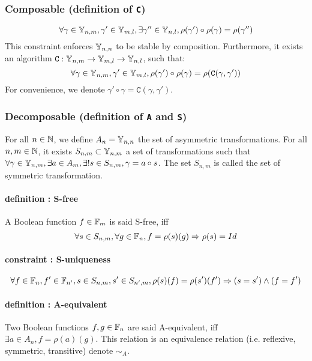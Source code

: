 \documentclass[a4paper,10pt]{article}
\begin{document}
\subsubsection{Composable (definition of \texttt{C})}
\[\forall \gamma \in \mathbb{Y}_{n, m}, \gamma' \in \mathbb{Y}_{m, l}, \exists \gamma'' \in \mathbb{Y}_{n, l}, \rho(\gamma') \circ 
\rho(\gamma) = \rho(\gamma'')\]
This constraint enforces $\mathbb{Y}_{n, n}$ to be stable by composition.
Furthermore, it exists an algorithm $\mathtt{C} : \mathbb{Y}_{n, m} \rightarrow \mathbb{Y}_{m, l} \rightarrow \mathbb{Y}_{n, l}$, such that:
\[\forall \gamma \in \mathbb{Y}_{n, m}, \gamma' \in \mathbb{Y}_{m, l}, \rho(\gamma') \circ \rho(\gamma) = \rho(\mathtt{C}(\gamma, \gamma'))\]
For convenience, we denote $\gamma' \circ \gamma = \mathtt{C}(\gamma, \gamma')$.

\subsubsection{Decomposable (definition of \texttt{A} and \texttt{S})}

For all $n\in\mathbb{N}$, we define $A_n = \mathbb{Y}_{n, n}$ the set of asymmetric transformations.
For all $n, m\in\mathbb{N}$, it exists $S_{n, m} \subset \mathbb{Y}_{n, m}$ a set of transformations such that $\forall \gamma \in \mathbb{Y}_{n, m}, \exists a \in A_m, \exists! s \in S_{n, m},  \gamma = a \circ s$.
The set $S_{n, m}$ is called the set of symmetric transformation.

\paragraph{definition : S-free\\}
A Boolean function $f\in\mathbb{F}_m$ is said S-free, iff
\[\forall s \in S_{n, m}, \forall g \in \mathbb{F}_n, f = \rho(s)(g) \Rightarrow \rho(s) = Id\]

\paragraph{constraint : S-uniqueness\\}
\[\forall f\in\mathbb{F}_n, f'\in\mathbb{F}_{n'}, s\in S_{n, m}, s'\in S_{n', m}, \rho(s)(f) = \rho(s')(f') \Rightarrow (s = s') \land (f = f')\]

\paragraph{definition : A-equivalent\\}
Two Boolean functions $f, g\in\mathbb{F}_n$ are said A-equivalent, iff $\exists a\in A_n, f = \rho(a)(g)$.
This relation is an equivalence relation (i.e. reflexive, symmetric, transitive) denote $\sim_A$.
\end{document}
